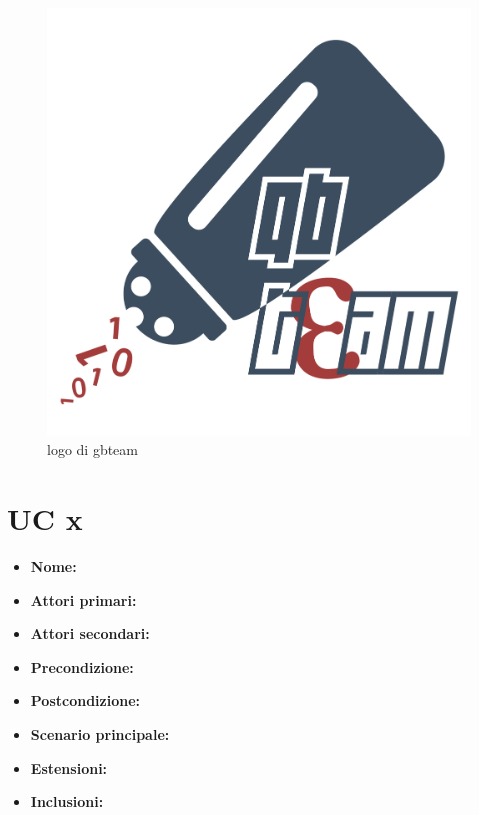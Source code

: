 \documentclass[a4paper, oneside, dvipsnames, table]{article} %
\begin{document}

\begin{figure}[h]
\centering
\includegraphics[scale=0.1]{qbteam.png}%
\caption{logo di gbteam}
\label{logo}
\end{figure}

\section{UC x}%
\begin{itemize}
\item \textbf{Nome:}
\item \textbf{Attori primari:}
\item \textbf{Attori secondari:}%
\item \textbf{Precondizione:}
\item \textbf{Postcondizione:}
\item \textbf{Scenario principale:} %
\item \textbf{Estensioni:}
\item \textbf{Inclusioni:}
\end{itemize}
\end{document}
